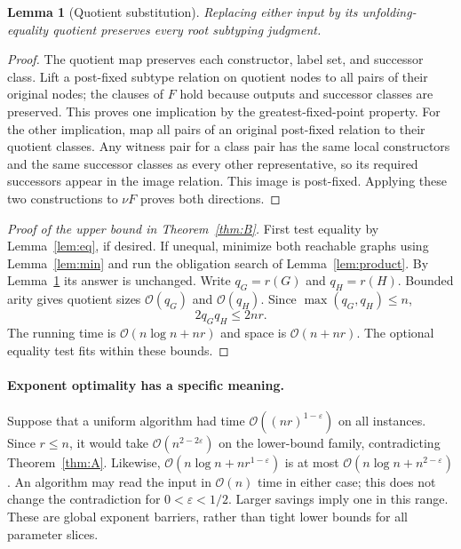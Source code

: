 \documentclass[11pt,letterpaper]{article}
\newtheorem{lemma}[theorem]{Lemma}
\theoremstyle{definition}\newtheorem{definition}[theorem]{Definition}
\newcommand{\Oh}{\mathcal O}
\begin{document}
\begin{lemma}[Quotient substitution]\label{lem:quot}
Replacing either input by its unfolding-equality quotient preserves every root subtyping judgment.
\end{lemma}
\begin{proof}
The quotient map preserves each constructor, label set, and successor class. Lift a post-fixed subtype relation on quotient nodes to all pairs of their original nodes; the clauses of $F$ hold because outputs and successor classes are preserved. This proves one implication by the greatest-fixed-point property. For the other implication, map all pairs of an original post-fixed relation to their quotient classes. Any witness pair for a class pair has the same local constructors and the same successor classes as every other representative, so its required successors appear in the image relation. This image is post-fixed. Applying these two constructions to $\nu F$ proves both directions.
\end{proof}

\begin{proof}[Proof of the upper bound in Theorem~\ref{thm:B}]
First test equality by Lemma~\ref{lem:eq}, if desired. If unequal, minimize both reachable graphs using Lemma~\ref{lem:min} and run the obligation search of Lemma~\ref{lem:product}. By Lemma~\ref{lem:quot} its answer is unchanged. Write $q_G=r(G)$ and $q_H=r(H)$. Bounded arity gives quotient sizes $\Oh(q_G)$ and $\Oh(q_H)$. Since $\max(q_G,q_H)\le n$,
\[
 2q_Gq_H\le 2nr.
\]
The running time is $\Oh(n\log n+nr)$ and space is $\Oh(n+nr)$. The optional equality test fits within these bounds.
\end{proof}

\paragraph{Exponent optimality has a specific meaning.}
Suppose that a uniform algorithm had time $\Oh((nr)^{1-\varepsilon})$ on all instances. Since $r\le n$, it would take $\Oh(n^{2-2\varepsilon})$ on the lower-bound family, contradicting Theorem~\ref{thm:A}. Likewise, $\Oh(n\log n+n r^{1-\varepsilon})$ is at most $\Oh(n\log n+n^{2-\varepsilon})$. An algorithm may read the input in $\Oh(n)$ time in either case; this does not change the contradiction for $0<\varepsilon<1/2$. Larger savings imply one in this range. These are global exponent barriers, rather than tight lower bounds for all parameter slices.
\end{document}
